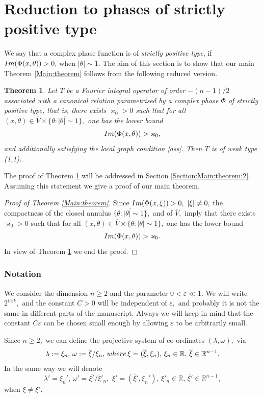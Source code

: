 \documentclass[12pt, reqno]{amsart}
\newtheorem{theorem}{Theorem}[section]
\theoremstyle{definition}
\theoremstyle{remark}
\numberwithin{equation}{section}
\begin{document}
\section{Reduction to phases of strictly positive type}\label{reduction}

 We say that a complex phase function is of {\it strictly positive type}, if $\textnormal{Im}(\Phi(x,\theta))>0,$ when $|\theta|\sim 1.$
 The aim of this section is to show that our main Theorem \ref{Main:theorem} follows from the following reduced version.

\begin{theorem}\label{Main:theorem:2} Let $T$ be a Fourier integral operator of order $-(n-1)/2$ associated with a canonical relation parametrised by a complex phase $\Phi$  of strictly positive type, that is,  there exists $\varkappa_0>0$ such that for all $(x,\theta)\in \overline{V}\times \overline{\{\theta: |\theta|\sim 1\}},$ one has the lower bound $$\textnormal{Im}(\Phi(x,\theta))>\varkappa_0,$$ 
and additionally satisfying the local graph condition \eqref{ass}. Then $T$ is of weak type (1,1).
\end{theorem}
 The proof of Theorem \ref{Main:theorem:2} will be addressed in Section \ref{Section:Main:theorem:2}. Assuming this statement we give a proof of our main theorem.
 \begin{proof}[Proof of Theorem \ref{Main:theorem}] Since $\textnormal{Im}(\Phi(x,\xi))> 0,\,\,|\xi|\neq 0,$ the compactness of the closed annulus $\overline{\{\theta: |\theta|\sim 1\}},$ and of $\overline{V},$ imply that there exists $\varkappa_0>0$ such that for all $(x,\theta)\in \overline{V}\times \overline{\{\theta: |\theta|\sim 1\}},$ one has the lower bound $$\textnormal{Im}(\Phi(x,\theta))>\varkappa_0.$$ In view of Theorem \ref{Main:theorem:2} we end the proof. 
 \end{proof}

\subsubsection*{Notation} We consider the dimension $n\geq 2$ and the parameter $0<\varepsilon\ll 1.$ We will write $2^{C\varepsilon k},$ and the constant $C>0$ will be independent of $\varepsilon,$ and probably it is not the same in different parts of the manuscript. Always we will keep in mind that the constant $C\varepsilon$ can be chosen small enough by allowing $\varepsilon$ to be arbitrarily small.     

Since $n\geq 2,$ we can define the projective system of co-ordinates $(\lambda,\omega),$ via
\begin{equation}\label{Proj:coor:nota}
    \lambda:=\xi_n,\,\omega:=\overline{\xi}/\xi_n,\,\textnormal{ where }\,\xi=(\overline{\xi},\xi_n),\,\xi_n\in \mathbb{R},\,\overline{\xi}\in \mathbb{R}^{n-1}.
\end{equation}In the same way we will denote 
\begin{equation}
    \lambda'=\xi_n',\,\omega'=\overline{\xi'}/\xi'_n,\,\,\xi'=(\overline{\xi}',\xi_n'),\,\xi'_n\in \mathbb{R},\,\overline{\xi'}\in \mathbb{R}^{n-1},
\end{equation}when $\xi\neq \xi'.$
\end{document}
